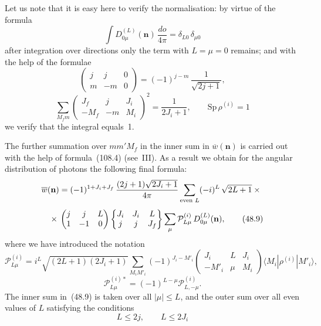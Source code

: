 Let us note that it is easy here to verify the normalisation: by virtue of the formula
\[
\int D^{(L)}_{0\mu}(\mathbf{n})\,\frac{do}{4\pi} = \delta_{L0}\,\delta_{\mu 0}
\]
after integration over directions only the term with $L = \mu = 0$ remains; and with the help of the formulae
\[
\begin{pmatrix} j & j & 0 \\ m & -m & 0\end{pmatrix} = (-1)^{j-m}\,\frac{1}{\sqrt{2j+1}},
\]
\[
\sum_{M_f m}\begin{pmatrix} J_f & j & J_i \\ -M_f & -m & M_i\end{pmatrix}^{\!2} = \frac{1}{2J_i + 1},\qquad \mathrm{Sp}\,\rho^{(i)} = 1
\]
we verify that the integral equals~1.

The further summation over $mm'M_f$ in the inner sum in $\overline{w}(\mathbf{n})$ is carried out with the help of formula~(108.4) (see~III). As a result we obtain for the angular distribution of photons the following final formula:
\begin{align}
\overline{w}(\mathbf{n}) &= (-1)^{1+J_i+J_f}\,\frac{(2j+1)\sqrt{2J_i+1}}{4\pi}\sum_{\text{even }L}(-i)^L\,\sqrt{2L+1}\times{}\notag\\[4pt]
{}\times{}&\begin{pmatrix} j & j & L \\ 1 & -1 & 0\end{pmatrix}\begin{Bmatrix} J_i & J_i & L \\ j & j & J_f\end{Bmatrix}\sum_\mu\mathcal{P}^{(i)}_{L\mu}\,D^{(L)}_{0\mu}(\mathbf{n}),
\tag{48.9}
\end{align}
where we have introduced the notation
\begin{equation}
\mathcal{P}^{(i)}_{L\mu} = i^L\sqrt{(2L+1)(2J_i+1)}\sum_{M_i M'_i}(-1)^{J_i - M'_i}\begin{pmatrix} J_i & L & J_i \\ -M'_i & \mu & M_i\end{pmatrix}\langle M_i|\rho^{(i)}|M'_i\rangle,
\tag{48.10}
\end{equation}
\[
\mathcal{P}^{(i)*}_{L\mu} = (-1)^{L-\mu}\mathcal{P}^{(i)}_{L,-\mu}.
\]
The inner sum in~(48.9) is taken over all $|\mu| \leqslant L$, and the outer sum over all even values of $L$ satisfying the conditions
\begin{equation}
L \leqslant 2j,\qquad L \leqslant 2J_i
\tag{48.11}
\end{equation}
